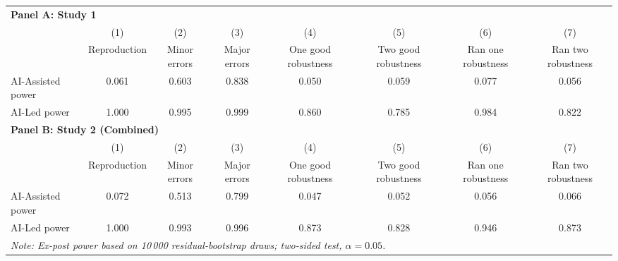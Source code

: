\begin{tabular}{l*{7}{c}}
\hline\hline
\multicolumn{8}{l}{\textbf{Panel A: Study 1}}\\
& (1) & (2) & (3) & (4) & (5) & (6) & (7)\\
                    &Reproduction   &Minor errors   &Major errors   &One good robustness   &Two good robustness   &Ran one robustness   &Ran two robustness   \\
\hline
AI-Assisted power    &0.061 & 0.603 & 0.838 & 0.050 & 0.059 & 0.077 & 0.056 \\
AI-Led power         &1.000 & 0.995 & 0.999 & 0.860 & 0.785 & 0.984 & 0.822 \\
\hline
\multicolumn{8}{l}{\textbf{Panel B: Study 2 (Combined)}}\\
& (1) & (2) & (3) & (4) & (5) & (6) & (7)\\
                    &Reproduction   &Minor errors   &Major errors   &One good robustness   &Two good robustness   &Ran one robustness   &Ran two robustness   \\
\hline
AI-Assisted power    &0.072 & 0.513 & 0.799 & 0.047 & 0.052 & 0.056 & 0.066 \\
AI-Led power         &1.000 & 0.993 & 0.996 & 0.873 & 0.828 & 0.946 & 0.873 \\
\hline
\hline\hline
\multicolumn{8}{l}{\it{Note:} Ex-post power based on 10\,000  residual-bootstrap draws; two-sided test, \(\alpha = 0.05\).}\\
\end{tabular}
